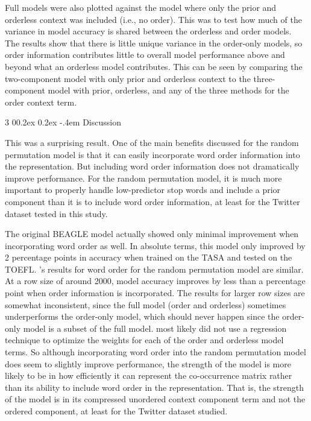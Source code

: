 \documentclass[man,floatsintext,donotrepeattitle]{apa6}
\makeatletter
\renewcommand{\subsubsection}{%
  \@startsection
  {subsubsection}%
  {3}%
  {\parindent}%
  {0\baselineskip \@plus 0.2ex \@minus 0.2ex}%
  {-.4em}%
  {\normalfont\normalsize\bfseries\addperi}}
\makeatother
\begin{document}
Full models were also plotted against the model where only the prior and orderless context was included (i.e., no order).
This was to test how much of the variance in model accuracy is shared between the orderless and order models.
The results show that there is little unique variance in the order-only models, so order information contributes little to overall model performance above and beyond what an orderless model contributes.
This can be seen by comparing the two-component model with only prior and orderless context to the three-component model with prior, orderless, and any of the three methods for the order context term.

\subsubsection{Discussion}

This was a surprising result.
One of the main benefits discussed for the random permutation model is that it can easily incorporate word order information into the representation.
But including word order information does not dramatically improve performance. 
For the random permutation model, it is much more important to properly handle low-predictor stop words and include a prior component than it is to include word order information,
at least for the Twitter dataset tested in this study.

The original BEAGLE model \parencite{Jones2007} actually showed only minimal improvement when incorporating word order as well.
In absolute terms, this model only improved by 2 percentage points in accuracy when trained on the TASA and tested on the TOEFL.
\textcite{Sahlgren2008}'s results for word order for the random permutation model are similar.
At a row size of around \num{2000}, model accuracy improves by less than a percentage point when order information is incorporated.
The results for larger row sizes are somewhat inconsistent, since the full model (order and orderless) sometimes underperforms the order-only model,
which should never happen since the order-only model is a subset of the full model.
\textcite{Sahlgren2008} most likely did not use a regression technique to optimize the weights for each of the order and orderless model terms.
So although incorporating word order into the random permutation model does seem to slightly improve performance,
the strength of the model is more likely to be in how efficiently it can represent the co-occurrence matrix rather than its ability to include word order in the representation.
That is, the strength of the model is in its compressed unordered context component term and not the ordered component, at least for the Twitter dataset studied.
\end{document}
